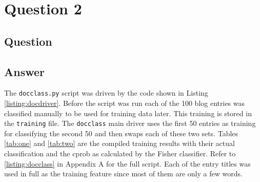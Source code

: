 \section{Question 2}

\subsection{Question}


\subsection{Answer}

The {\tt docclass.py} script was driven by the code shown in Listing \ref{listing:docdriver}. Before the script was run each of the 100 blog entries was classified manually to be used for training data later. This training is stored in the {\tt training} file. The {\tt docclass} main driver uses the first 50 entries as training for classifying the second 50 and then swaps each of these two sets. Tables \ref{tab:one} and \ref{tab:two} are the compiled training results with their actual classification and the cprob as calculated by the Fisher classifier. Refer to \ref{listing:docclass} in Appendix A for the full script. Each of the entry titles was used in full as the training feature since most of them are only a few words.

\clearpage



\clearpage

